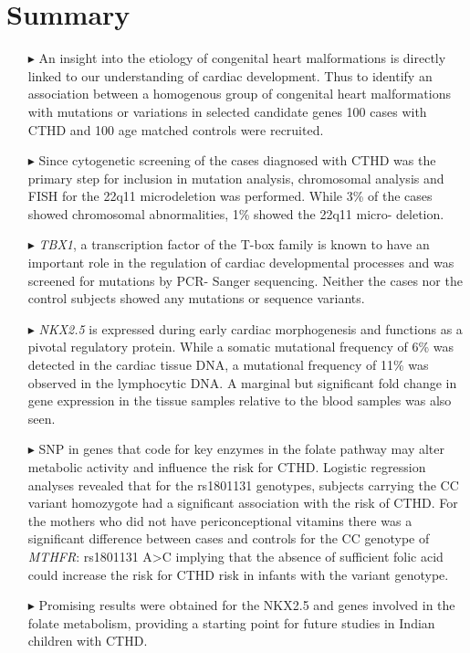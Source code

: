 \chapter{Summary}

\begin{itemize}

\item[$\blacktriangleright$] An insight into the etiology of congenital heart malformations is directly linked to our understanding of cardiac development. Thus to identify an association between a homogenous group of congenital heart malformations with mutations or variations in selected candidate genes 100 cases with CTHD and 100 age  matched controls were recruited.

\item[$\blacktriangleright$] Since cytogenetic screening of the cases diagnosed with CTHD was the primary step for inclusion in mutation analysis, chromosomal analysis and FISH for the 22q11 microdeletion was performed. While 3\% of the cases showed chromosomal abnormalities, 1\% showed the 22q11 micro- deletion.

\item[$\blacktriangleright$] \textit{TBX1}, a transcription factor of the T-box family is known to have an important role in the regulation of cardiac developmental processes and  was screened for mutations by PCR- Sanger sequencing. Neither the cases nor the control subjects showed any mutations or sequence variants.

\item[$\blacktriangleright$] \textit{NKX2.5} is expressed during early cardiac morphogenesis and functions as a pivotal regulatory protein. While a somatic mutational frequency of 6\% was detected in the cardiac tissue DNA, a mutational frequency of 11\% was observed in the lymphocytic DNA. A marginal but significant fold change in gene expression in the tissue samples relative to the blood samples was also seen.

\item[$\blacktriangleright$] SNP in genes that code for key enzymes in the folate pathway may alter metabolic activity and influence the risk for CTHD. Logistic regression analyses revealed that for the rs1801131 genotypes, subjects carrying the CC variant homozygote had a significant association with the risk of CTHD. For the mothers who did not have periconceptional vitamins there was a significant difference between cases and controls for the CC genotype of \textit{MTHFR}: rs1801131 A>C implying that the absence of sufficient folic acid could increase the risk for CTHD risk in infants with the variant genotype.

\item[$\blacktriangleright$] Promising results were obtained for the NKX2.5 and genes involved in the folate metabolism, providing a starting point for future studies in Indian children with CTHD.

\end{itemize}